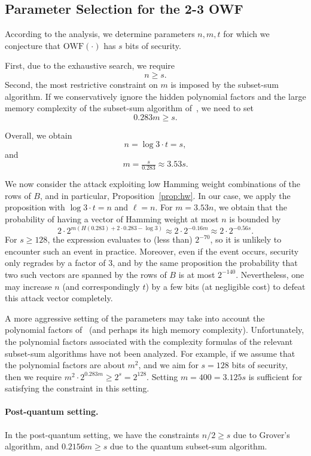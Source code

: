 \documentclass[orivec,envcountsect]{llncs}
\newcommand{\OWF}{\text{OWF}}
\begin{document}
\subsection{Parameter Selection for the 2-3 OWF}


According to the analysis, we determine parameters $n,m,t$ for which
we conjecture that $\OWF(\cdot)$ has $s$ bits of security.

First, due to the exhaustive search, we require $$n \geq s.$$
Second,
the most restrictive constraint on $m$ is imposed by the subset-sum algorithm.
If we conservatively ignore the hidden polynomial factors and the large memory
complexity of the subset-sum algorithm of~\cite{BonnetainBSS20}, we need to set
$$0.283m \geq s.$$

Overall, we obtain
$$n = \log 3 \cdot t = s,$$
and $$m = \tfrac{s}{0.283} \approx 3.53 s.$$

We now consider the attack exploiting low Hamming weight combinations of the rows of $B$,
and in particular, Proposition~\ref{prop:hw}.
In our case, we apply the proposition with $\log 3 \cdot t = n$ and $\ell = n$.
For $m = 3.53 n$, we obtain that the probability of having a vector of Hamming weight at most $n$ is bounded by
$$2 \cdot 2^{m (H(0.283) + 2 \cdot 0.283 - \log 3)} \approx 2 \cdot 2^{-0.16m} \approx 2 \cdot 2^{- 0.56 s}.$$
For $s \geq 128$, the expression evaluates to (less than) $2^{-70}$, so it is unlikely to encounter such an event in practice.
Moreover, even if the event occurs, security only regrades by a factor of 3, and by the same
proposition the probability that two such vectors are spanned by the rows of $B$ is at most $2^{-140}$.
Nevertheless, one may increase $n$ (and correspondingly $t$)
by a few bits (at negligible cost) to defeat this attack vector completely.

A more aggressive setting of the parameters may take into account the polynomial factors of~\cite{BonnetainBSS20} (and perhaps its high memory complexity). Unfortunately, the polynomial factors associated with the complexity formulas of the relevant subset-sum algorithms have not been analyzed.
For example, if we assume that the polynomial factors are about $m^2$, and we aim for $s = 128$ bits of security, then
we require $m^2 \cdot 2^{0.283m} \geq 2^{s} = 2^{128}$. Setting $m = 400 = 3.125 s$ is sufficient for satisfying the constraint in this setting.


\paragraph{Post-quantum setting.}
In the post-quantum setting, we have the constraints
$n/2 \geq s$
due to Grover's algorithm, and
$0.2156 m \geq s$
due to the quantum subset-sum algorithm.
\end{document}
